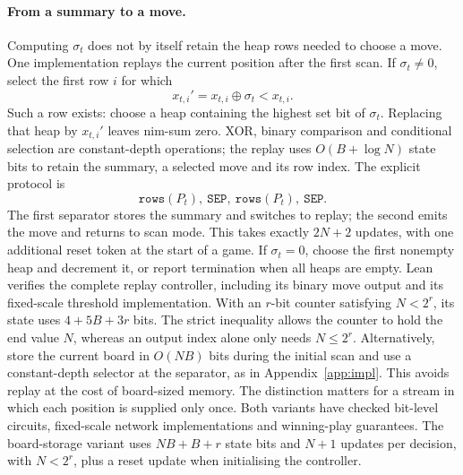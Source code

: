 \documentclass[twoside,11pt]{article}
\numberwithin{theorem}{section}
\numberwithin{equation}{section}
\begin{document}
\paragraph{From a summary to a move.}
Computing $\sigma_t$ does not by itself retain the heap rows needed to choose a move. One implementation replays the current position after the first scan. If $\sigma_t\ne0$, select the first row $i$ for which
\[
x_{t,i}'=x_{t,i}\oplus\sigma_t<x_{t,i}.
\]
Such a row exists: choose a heap containing the highest set bit of $\sigma_t$. Replacing that heap by $x_{t,i}'$ leaves nim-sum zero. XOR, binary comparison and conditional selection are constant-depth operations; the replay uses $O(B+\log N)$ state bits to retain the summary, a selected move and its row index. The explicit protocol is
\[
\mathtt{rows}(P_t),\ \mathtt{SEP},\ \mathtt{rows}(P_t),\ \mathtt{SEP}.
\]
The first separator stores the summary and switches to replay; the second emits the move and returns to scan mode. This takes exactly $2N+2$ updates, with one additional reset token at the start of a game. If $\sigma_t=0$, choose the first nonempty heap and decrement it, or report termination when all heaps are empty. Lean verifies the complete replay controller, including its binary move output and its fixed-scale threshold implementation. With an $r$-bit counter satisfying $N<2^r$, its state uses $4+5B+3r$ bits. The strict inequality allows the counter to hold the end value $N$, whereas an output index alone only needs $N\le2^r$.
Alternatively, store the current board in $O(NB)$ bits during the initial scan and use a constant-depth selector at the separator, as in Appendix~\ref{app:impl}. This avoids replay at the cost of board-sized memory. The distinction matters for a stream in which each position is supplied only once. Both variants have checked bit-level circuits, fixed-scale network implementations and winning-play guarantees. The board-storage variant uses $NB+B+r$ state bits and $N+1$ updates per decision, with $N<2^r$, plus a reset update when initialising the controller.
\end{document}
